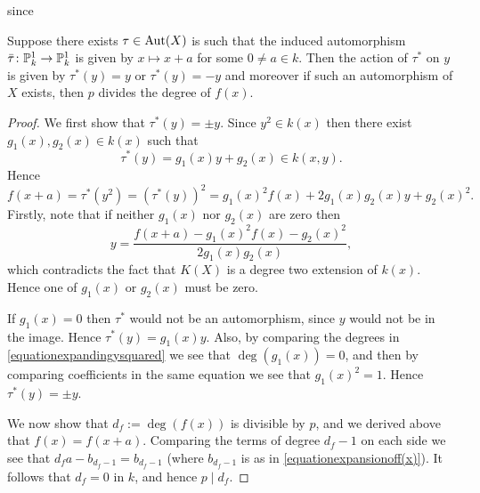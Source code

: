 since 

\begin{lem}\label{lemmatauactsbyplusminusoneony}
    Suppose there exists $\tau \in \operatorname{Aut}(X)$ is such that the induced automorphism $\bar \tau \colon \mathbb P_k^1 \rightarrow \mathbb P_k^1$ is given by $x \mapsto x+ a$ for some $0 \neq a \in k$.
    Then the action of $\tau^*$ on $y$ is given by $\tau^*(y) = y$ or $\tau^*(y) = -y$ and moreover if such an automorphism of $X$ exists, then $p$ divides the degree of $f(x)$.
    \end{lem}
    \begin{proof}
    We first show that $\tau^*(y) = \pm y$.
    Since $y^2 \in k(x)$ then there exist $g_1(x), g_2(x) \in k(x)$ such that 
        \begin{equation*}
        \tau^*(y) = g_1(x)y + g_2(x) \in k(x,y).
        \end{equation*}
    Hence
        \begin{equation}\label{equationexpandingysquared}
        f(x+a) = \tau^*(y^2) = (\tau^*(y))^2 = g_1(x)^2f(x)+2g_1(x)g_2(x)y + g_2(x)^2.
        \end{equation}
    Firstly, note that if neither $g_1(x)$ nor $g_2(x)$ are zero then
        \[
        y = \frac{f(x+a) - g_1(x)^2f(x) - g_2(x)^2}{2g_1(x)g_2(x)},
        \]
    which contradicts the fact that $K(X)$ is a degree two extension of $k(x)$.
    Hence one of $g_1(x)$ or $g_2(x)$ must be zero.
    
    If $g_1(x) = 0$ then $\tau^*$ would not be an automorphism, since $y$ would not be in the image.
    Hence $\tau^*(y) = g_1(x)y$.
    Also, by comparing the degrees in \eqref{equationexpandingysquared} we see that $\deg(g_1(x)) = 0$, and then by comparing coefficients in the same equation we see that $g_1(x)^2 = 1$.
    Hence $\tau^*(y) = \pm y$.

    We now show that $d_f := \deg(f(x))$ is divisible by $p$, and we derived above that $f(x) = f(x+a)$.
    Comparing the terms of degree $d_f-1$ on each side we see that $d_fa - b_{d_f -1} = b_{d_f-1}$ (where $b_{d_f - 1}$ is as in \eqref{equationexpansionoff(x)}).
    It follows that $d_f = 0$ in $k$, and hence $p \mid d_f$.
    \end{proof}

